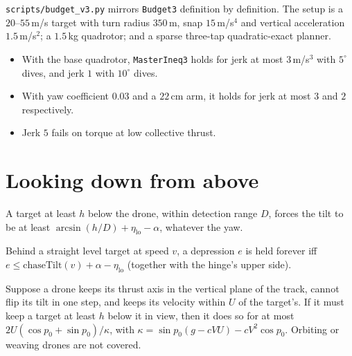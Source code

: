 \begin{remark}
\texttt{scripts/budget\_v3.py} mirrors \texttt{Budget3} definition by definition. The
setup is a $20$--$55$\,m/s target with turn radius $350$\,m, snap $15$\,m/s$^4$ and
vertical acceleration $1.5$\,m/s$^2$; a $1.5$\,kg quadrotor; and a sparse three-tap
quadratic-exact planner.
\begin{itemize}
  \item With the base quadrotor, \texttt{MasterIneq3} holds for jerk at most
        $3$\,m/s$^3$ with $5^\circ$ dives, and jerk $1$ with $10^\circ$ dives.
  \item With yaw coefficient $0.03$ and a $22$\,cm arm, it holds for jerk at most $3$ and
        $2$ respectively.
  \item Jerk $5$ fails on torque at low collective thrust.
\end{itemize}
\end{remark}

\chapter{Looking down from above}
\label{chap:lookdown}

\begin{lemma}
\label{lem:lookdown}
\leanok
A target at least $h$ below the drone, within detection range $D$, forces the tilt to be at
least $\arcsin(h/D)+\eta_{\mathrm{lo}}-\alpha$, whatever the yaw.
\end{lemma}

\begin{theorem}
\label{thm:lookdown-steady}
\leanok
{}
Behind a straight level target at speed $v$, a depression $e$ is held forever iff
$e\le\mathrm{chaseTilt}(v)+\alpha-\eta_{\mathrm{lo}}$ (together with the hinge's upper side).
\end{theorem}

\begin{theorem}
\label{thm:forced-loss}
\leanok
{}
Suppose a drone keeps its thrust axis in the vertical plane of the track, cannot flip its
tilt in one step, and keeps its velocity within $U$ of the target's. If it must keep a
target at least $h$ below it in view, then it does so for at most
$2U(\cos p_0+\sin p_0)/\kappa$, with $\kappa=\sin p_0(g-cVU)-cV^2\cos p_0$. Orbiting or
weaving drones are not covered.
\end{theorem}

